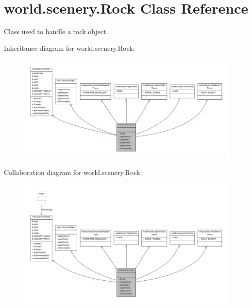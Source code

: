 \hypertarget{a00022}{\section{world.\-scenery.\-Rock Class Reference}
\label{a00022}
}


Class used to handle a rock object.  




Inheritance diagram for world.\-scenery.\-Rock\-:
\nopagebreak
\begin{figure}[H]
\begin{center}
\leavevmode
\includegraphics[width=350pt]{a00170}
\end{center}
\end{figure}


Collaboration diagram for world.\-scenery.\-Rock\-:
\nopagebreak
\begin{figure}[H]
\begin{center}
\leavevmode
\includegraphics[width=350pt]{a00171}
\end{center}
\end{figure}
